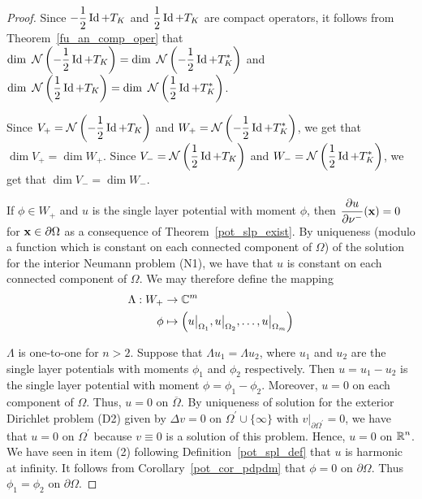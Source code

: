 \begin{proof}
Since $\displaystyle -\frac{1}{2} \operatorname{Id} + T_K$ and
$\displaystyle \frac{1}{2} \operatorname{Id} + T_K$ are compact operators, it
follows from Theorem~\ref{fu_an_comp_oper} that
$\displaystyle \dim\ \mathcal{N} \left(-\frac{1}{2} \operatorname{Id} + T_K\right) =
\dim\ \mathcal{N} \left(-\frac{1}{2} \operatorname{Id} + T_K^\ast \right)$
and $\displaystyle \dim\ \mathcal{N} \left(\frac{1}{2} \operatorname{Id} + T_K\right) =
\dim\ \mathcal{N} \left(\frac{1}{2} \operatorname{Id} + T_K^\ast \right)$.

Since $\displaystyle V_+ = \mathcal{N} \left(-\frac{1}{2} \operatorname{Id} + T_K\right)$
and $\displaystyle W_+ = \mathcal{N} \left(-\frac{1}{2} \operatorname{Id} + T_K^\ast \right)$, 
we get that $\dim V_+ = \dim W_+$.  Since
$\displaystyle V_- = \mathcal{N} \left(\frac{1}{2} \operatorname{Id} + T_K\right)$
and $\displaystyle W_- = \mathcal{N} \left(\frac{1}{2} \operatorname{Id} + T_K^\ast \right)$, 
we get that $\dim V_- = \dim W_-$.

 If $\phi \in W_+$ and $u$ is the single layer potential with
moment $\phi$, then $\displaystyle \frac{\partial{u}}{\partial \mathbf{\nu}^-}(\mathbf{x}) = 0$
for $\mathbf{x} \in \partial \Omega$ as a consequence of
Theorem~\ref{pot_slp_exist}.  By uniqueness (modulo a
function which is constant on each connected component of $\Omega$)
of the solution for the interior Neumann problem (N1), we have that
$u$ is constant on each connected component of $\Omega$.  We may
therefore define the mapping
\begin{align*}
\Lambda : W_+ & \rightarrow \mathbb{C}^m \\
\phi &\mapsto \left( u\big|_{\Omega_1}, u\big|_{\Omega_2},
\ldots, u\big|_{\Omega_m}\right)
\end{align*}

 $\Lambda$ is one-to-one for $n>2$.  Suppose that
$\Lambda u_1 = \Lambda u_2$, where $u_1$ and $u_2$ are the single
layer potentials with moments $\phi_1$ and $\phi_2$ respectively.
Then $u=u_1-u_2$ is the single layer potential with moment
$\phi = \phi_1-\phi_2$.  Moreover, $u = 0$ on each component of
$\Omega$.  Thus, $u = 0$ on $\overline{\Omega}$.  By uniqueness of
solution for the exterior Dirichlet problem (D2) given by
$\Delta v = 0$ on $\displaystyle \Omega^{\prime} \cup \{\infty\}$ 
with $\displaystyle v\big|_{\partial \Omega^{\prime}}=0$,
we have that $u=0$ on $\Omega^{\prime}$ because $v \equiv 0$ is a
solution of this problem.  Hence, $u=0$ on $\displaystyle \mathbb{R}^n$.
We have seen in item (2) following Definition~\ref{pot_spl_def} that
$u$ is harmonic at infinity.
It follows from Corollary~\ref{pot_cor_pdpdm} that $\phi =0$ on
$\partial \Omega$.  Thus $\phi_1=\phi_2$ on $\partial \Omega$.


\end{proof}
